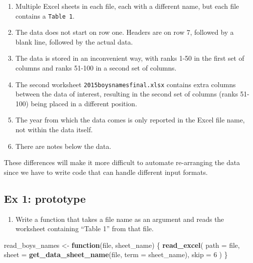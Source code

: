 \documentclass[
]{book}
\newenvironment{Shaded}{\begin{snugshade}}{\end{snugshade}}
\newcommand{\ControlFlowTok}[1]{\textcolor[rgb]{0.13,0.29,0.53}{\textbf{#1}}}
\newcommand{\DataTypeTok}[1]{\textcolor[rgb]{0.13,0.29,0.53}{#1}}
\newcommand{\DecValTok}[1]{\textcolor[rgb]{0.00,0.00,0.81}{#1}}
\newcommand{\KeywordTok}[1]{\textcolor[rgb]{0.13,0.29,0.53}{\textbf{#1}}}
\newcommand{\NormalTok}[1]{#1}
\newcommand{\StringTok}[1]{\textcolor[rgb]{0.31,0.60,0.02}{#1}}
\providecommand{\tightlist}{%
  \setlength{\itemsep}{0pt}\setlength{\parskip}{0pt}}
\begin{document}
\begin{enumerate}
\def\labelenumi{\arabic{enumi}.}
\tightlist
\item
  Multiple Excel sheets in each file, each with a different name, but each file contains a \texttt{Table\ 1}.
\item
  The data does not start on row one. Headers are on row 7, followed by a blank line, followed by the actual data.
\item
  The data is stored in an inconvenient way, with ranks 1-50 in the first set of columns and ranks 51-100 in a second set of columns.
\item
  The second worksheet \texttt{2015boysnamesfinal.xlsx} contains extra columns between the data of interest, resulting in the second set of columns (ranks 51-100) being placed in a different position.
\item
  The year from which the data comes is only reported in the Excel file name, not within the data itself.
\item
  There are notes below the data.
\end{enumerate}

These differences will make it more difficult to automate
re-arranging the data since we have to write code that can handle
different input formats.

\hypertarget{ex-1-prototype-3}{%
\subsection{Ex 1: prototype}\label{ex-1-prototype-3}}

\begin{enumerate}
\def\labelenumi{\arabic{enumi}.}
\tightlist
\item
  Write a function that takes a file name as an argument and reads the worksheet containing ``Table 1'' from that file.
\end{enumerate}

\begin{Shaded}
\begin{Highlighting}[]
\NormalTok{read_boys_names <-}\StringTok{ }\ControlFlowTok{function}\NormalTok{(file, sheet_name) \{}
  \KeywordTok{read_excel}\NormalTok{(}
    \DataTypeTok{path =}\NormalTok{ file,}
    \DataTypeTok{sheet =} \KeywordTok{get_data_sheet_name}\NormalTok{(file, }\DataTypeTok{term =}\NormalTok{ sheet_name),}
    \DataTypeTok{skip =} \DecValTok{6}
\NormalTok{  )}
\NormalTok{\}}
\end{Highlighting}
\end{Shaded}
\end{document}
